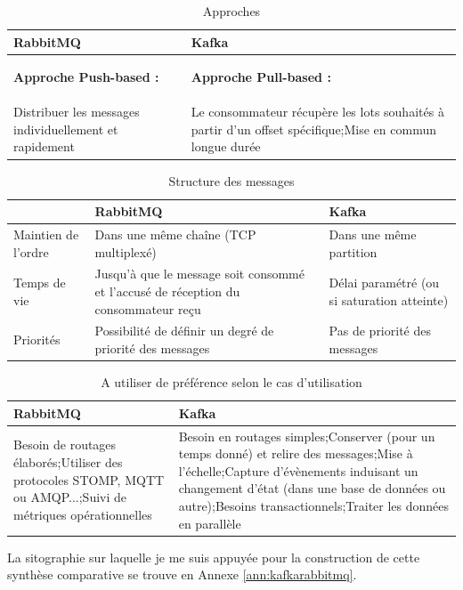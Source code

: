 \documentclass{article}
\begin{document}
			\medskip
			\begin{table}[hp]
				\begin{tabular}{|p{7.5cm}|p{7.5cm}|}
				\hline
				\rowcolor{lightgray} RabbitMQ & Kafka\\\hline
				\begin{center} \textbf{Approche Push-based :}\end{center} & \begin{center} \textbf{Approche Pull-based :}\end{center}\\\hline
				Distribuer les messages individuellement et rapidement & Le consommateur récupère les lots souhaités à partir d’un offset spécifique;\newline Mise en commun longue durée\\\hline
				\end{tabular}
				\caption{Approches}
				\label{tab:comparatifapp}
			\end{table}
			\medskip
			\begin{table}[hp]
				\begin{tabular}{|p{3cm}|p{6cm}|p{6cm}|}
					\hline
					\rowcolor{lightgray} & RabbitMQ & Kafka\\\hline
					Maintien de l'ordre & Dans une même chaîne (TCP multiplexé) & Dans une même partition\\\hline
					Temps de vie & Jusqu’à que le message soit consommé et l'accusé de réception du consommateur reçu & Délai paramétré (ou si saturation atteinte)\\\hline
					Priorités & Possibilité de définir un degré de priorité des messages & Pas de priorité des messages \\\hline
				\end{tabular}
				\caption{Structure des messages}
				\label{tab:comparatifmess}
			\end{table}
			\medskip
			\begin{table}[hp]
				\begin{tabular}{|p{7.5cm}|p{7.5cm}|}
				\hline
				\rowcolor{lightgray} RabbitMQ & Kafka\\\hline
				Besoin de routages élaborés;\newline Utiliser des protocoles STOMP, MQTT ou AMQP...;\newline Suivi de métriques opérationnelles & Besoin en routages simples;\newline Conserver (pour un temps donné) et relire des messages;\newline Mise à l’échelle;\newline Capture d’évènements induisant un changement d’état (dans une base de données ou autre);\newline Besoins transactionnels;\newline Traiter les données en parallèle\\\hline
				\end{tabular}
				\caption{A utiliser de préférence selon le cas d'utilisation}
				\label{tab:comparatifpref}
			\end{table}
			La sitographie sur laquelle je me suis appuyée pour la construction de cette synthèse comparative se trouve en Annexe \ref{ann:kafkarabbitmq}.
\end{document}
